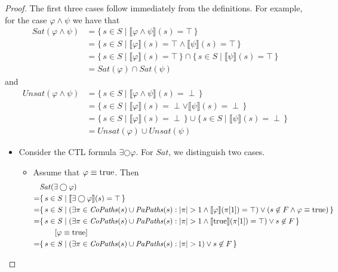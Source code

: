 \documentclass[12pt]{article}
\newcommand{\nxt}{\bigcirc}
\newcommand{\TRUE}{\mbox{\lstinline{true}}}
\theoremstyle{definition}
\newcommand{\comment}[1]{\hspace{2em}[\mbox{#1}]}
\newcommand{\satisfaction}[1]{\llbracket #1 \rrbracket}
\newenvironment{franck}{\color{red}}{\color{black}}
\begin{document}
\begin{proof}
The first three cases follow immediately from the definitions.  For example, for the case $\varphi \wedge \psi$ we have that
\begin{align*}
\mathit{Sat}(\varphi \wedge \psi) 
& = \{\, s \in S \mid \satisfaction{\varphi \wedge \psi}(s) = \top \,\}\\
& = \{\, s \in S \mid \satisfaction{\varphi}(s) = \top \wedge \satisfaction{\psi}(s) = \top \,\}\\
& = \{\, s \in S \mid \satisfaction{\varphi}(s) = \top \,\} \cap \{\, s \in S \mid \satisfaction{\psi}(s) = \top \,\}\\
& = \mathit{Sat}(\varphi) \cap \mathit{Sat}(\psi)
\end{align*}
and
\begin{align*}
\mathit{Unsat}(\varphi \wedge \psi) 
& = \{\, s \in S \mid \satisfaction{\varphi \wedge \psi}(s) = \perp \,\}\\
& = \{\, s \in S \mid \satisfaction{\varphi}(s) = \perp \vee \satisfaction{\psi}(s) = \perp \,\}\\
& = \{\, s \in S \mid \satisfaction{\varphi}(s) = \perp \,\} \cup \{\, s \in S \mid \satisfaction{\psi}(s) = \perp \,\}\\
& = \mathit{Unsat}(\varphi) \cup \mathit{Unsat}(\psi)
\end{align*}
\begin{itemize}
\item 
\begin{franck}
Consider the CTL formula $\exists \nxt \varphi$.  
For $\mathit{Sat}$, we distinguish two cases.
\begin{itemize}
\item 
Assume that $\varphi \equiv \TRUE$.  Then
\begin{align*}
& \mathit{Sat}(\exists \nxt \varphi)\\
= & \{\, s \in S \mid \satisfaction{\exists \nxt \varphi}(s) = \top \,\}\\
= & \{\, s \in S \mid (\exists \pi \in \mathit{CoPaths}(s) \cup \mathit{PaPaths}(s) : |\pi| > 1 \wedge \satisfaction{\varphi}(\pi[1]) = \top) \vee (s \not\in F \wedge \varphi \equiv \TRUE) \,\}\\
= & \{\, s \in S \mid (\exists \pi \in \mathit{CoPaths}(s) \cup \mathit{PaPaths}(s) : |\pi| > 1 \wedge \satisfaction{\TRUE}(\pi[1]) = \top) \vee s \not\in F \,\}\\
& \comment{$\varphi \equiv \TRUE$}\\
= & \{\, s \in S \mid (\exists \pi \in \mathit{CoPaths}(s) \cup \mathit{PaPaths}(s) : |\pi| > 1) \vee s \not\in F \,\}\\

\end{align*}
\end{itemize}
\end{franck}
\end{itemize}
\end{proof}
\end{document}

